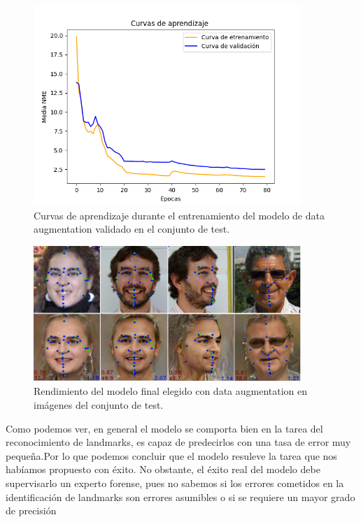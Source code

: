         \begin{figure}[!h]
            \centering
            \includegraphics[width=0.9\textwidth]{img/curvas_FinalModel.png}
            \caption{Curvas de aprendizaje durante el entrenamiento del modelo de data augmentation validado en el conjunto de test.}
            \label{fig:curvas_FinalModel}
        \end{figure}

        \begin{figure}[!h]
            \centering
            \includegraphics[width=0.9\textwidth]{img/image_finalmodel.png}
            \caption{Rendimiento del modelo final elegido con data augmentation en imágenes del conjunto de test.}
            \label{fig:Ejemplo_finalmodel}
        \end{figure}

        \medskip

        \noindent Como podemos ver, en general el modelo se comporta bien en la tarea del reconocimiento de landmarks, es capaz de predecirlos con una tasa de error muy pequeña.Por lo que podemos concluir que el modelo resuleve la tarea que nos habíamos propuesto con éxito. No obstante, el éxito real del modelo debe supervisarlo un experto forense, pues no sabemos si los errores cometidos en la identificación de landmarks son errores asumibles o si se requiere un mayor grado de precisión
\endinput



